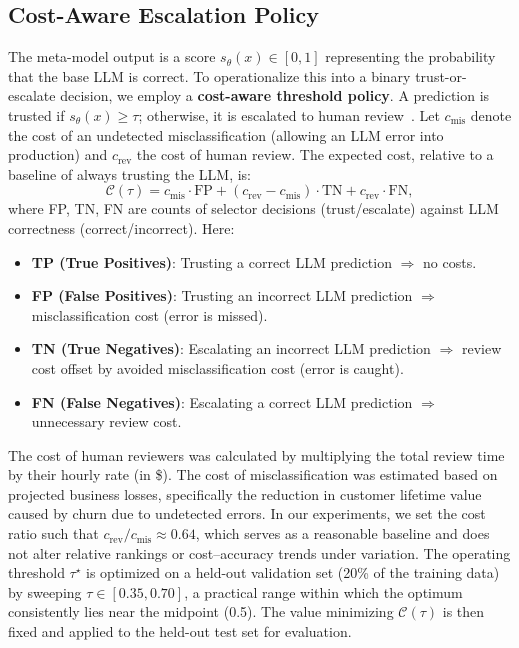 \subsection{Cost-Aware Escalation Policy}
\label{subsec:policy}
The meta-model output is a score $s_\theta(x) \in [0,1]$ representing the probability that the base LLM is correct. To operationalize this into a binary trust-or-escalate decision, we employ a \textbf{cost-aware threshold policy}. A prediction is trusted if $s_\theta(x) \geq \tau$; otherwise, it is escalated to human review~\cite{elkan+al:01}.
Let $c_{\text{mis}}$ denote the cost of an undetected misclassification (allowing an LLM error into production) and $c_{\text{rev}}$ the cost of human review. The expected cost, relative to a baseline of always trusting the LLM, is:
\[
\mathcal{C}(\tau) = c_{\text{mis}} \cdot \text{FP} + (c_{\text{rev}} - c_{\text{mis}}) \cdot \text{TN} + c_{\text{rev}} \cdot \text{FN},
\]
where FP, TN, FN are counts of selector decisions (trust/escalate) against LLM correctness (correct/incorrect). Here:
\begin{itemize}
    \item \textbf{TP (True Positives)}: Trusting a correct LLM prediction $\Rightarrow$ no costs.
    \item \textbf{FP (False Positives)}: Trusting an incorrect LLM prediction $\Rightarrow$ misclassification cost (error is missed).
    \item \textbf{TN (True Negatives)}: Escalating an incorrect LLM prediction $\Rightarrow$ review cost offset by avoided misclassification cost (error is caught).
    \item \textbf{FN (False Negatives)}: Escalating a correct LLM prediction $\Rightarrow$ unnecessary review cost.
\end{itemize}
The cost of human reviewers was calculated by multiplying the total review time by their hourly rate (in \$). The cost of misclassification was estimated based on projected business losses, specifically the reduction in customer lifetime value caused by churn due to undetected errors. In our experiments, we set the cost ratio such that $c_{\text{rev}} / c_{\text{mis}} \approx 0.64$, which serves as a reasonable baseline and does not alter relative rankings or cost–accuracy trends under variation.
The operating threshold $\tau^{\star}$ is optimized on a held-out validation set (20\% of the training data) by sweeping $\tau \in [0.35, 0.70]$, a practical range within which the optimum consistently lies near the midpoint (0.5). The value minimizing $\mathcal{C}(\tau)$ is then fixed and applied to the held-out test set for evaluation.
